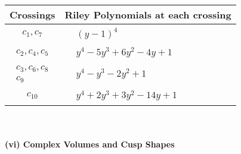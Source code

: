 \documentclass[1p]{elsarticle_modified}
\theoremstyle{definition}
\begin{document}
\begin{tabular}{m{50pt}|m{274pt}}
Crossings & \hspace{64pt}Riley Polynomials at each crossing \\
\hline $$\begin{aligned}c_{1},c_{7}\end{aligned}$$&$\begin{aligned}
&(y-1)^4
\end{aligned}$\\
\hline $$\begin{aligned}c_{2},c_{4},c_{5}\end{aligned}$$&$\begin{aligned}
&y^4-5 y^3+6 y^2-4 y+1
\end{aligned}$\\
\hline $$\begin{aligned}c_{3},c_{6},c_{8}\\c_{9}\end{aligned}$$&$\begin{aligned}
&y^4- y^3-2 y^2+1
\end{aligned}$\\
\hline $$\begin{aligned}c_{10}\end{aligned}$$&$\begin{aligned}
&y^4+2 y^3+3 y^2-14 y+1
\end{aligned}$\\
\hline
\end{tabular}\\~\\
\newpage\flushleft \textbf{(vi) Complex Volumes and Cusp Shapes}
\end{document}
